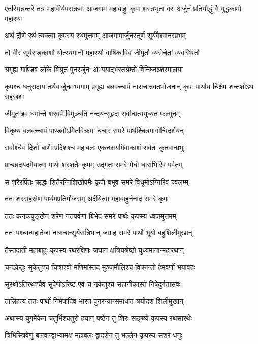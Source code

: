 \threelineshloka
{एतस्मिन्नन्तरे तत्र महावीर्यपराक्रमः}
{आजगाम महाबाहुः कृपः शस्त्रभृतां वरः}
{अर्जुनं प्रतियोद्धुं वै युद्धकामो महारथः}


\twolineshloka
{अथं द्रौणे रथं त्यक्त्वा कृपस्य रथमुत्तमम्}
{आजगामार्जुनस्तूर्णं सूर्यवैश्वानरप्रभम्}


\twolineshloka
{तौ वीर सूर्यसङ्काशौ योत्स्यमानौ महारथौ}
{वाषिकाविव जीमूतौ व्यरोचेतां व्यवस्थितौ}


\twolineshloka
{श्रगृह्य गाण्डिवं लोके विश्रुतं पुनरर्जुनः}
{अभ्ययाद्भरतश्रेष्ठो विनिघ्नञ्शरमालया}


\onelineshloka
{कृपश्च धनुरादाय तथैवार्जुनमभ्यगाम्}
\twolineshloka
{प्रगृह्य बलवच्चापं नाराचान्रक्तभोजनान्}
{कृपः पार्थाय चिक्षेप शन्तशोऽथ सहस्रशः}


\twolineshloka
{जीमूत इव धर्मान्ते शरवर्पं विमुञ्चति}
{नन्दयन्सुहृदः सर्वान्प्रत्ययुध्यत फल्गुनम्}


\twolineshloka
{विकृष्य बलवच्चापं पाण्डवोऽमितविक्रमः}
{चचार समरे पार्थश्चित्रमार्गान्विदर्शयन्}


\twolineshloka
{सर्वाश्चैव दिशो बाणैः प्रदिशश्च महाबलः}
{एकच्छायमिवाकाशं सर्वतः कृतवान्प्रभुः}


\twolineshloka
{प्राच्छादयदमेयात्मा पार्थः शरशतैः कृपम्}
{उद्गतः समरे मेघो धाराभिरिव पर्वतम्}


\twolineshloka
{स शरैरर्पितः ऋद्धः शितैरग्निशिखोपमैः}
{कृपो बभूव समरे विधूमोऽग्निरिव ज्वलम्म्}


\twolineshloka
{ततः शरसहस्रेण पार्थमप्रतिमौजसम्}
{अर्दयित्वा महाबाहुर्ननाद समरे कृपः}


\twolineshloka
{ततः कनकपुङ्खेन शरेण नतपर्वणा}
{बिभेद समरे पार्थः कृपस्य ध्वजमुत्तमम्}


\twolineshloka
{ततः पश्चान्महातेजा नाराचान्सूर्यसन्निभान्}
{जग्राह समरे पार्थो भूयो बहुशिलीमुखान्}


\twolineshloka
{तैस्तदातीं महाबाहुः कृपस्य रथरक्षिणः}
{जघान क्षत्रियश्रेष्ठो युध्यमानान्महारथान्}


\twolineshloka
{चन्द्रकेतुः सुकेतुश्च चित्राश्वो मणिमांस्तद}
{मुञ्जमौलिश्च विक्रान्तो हेमवर्णो भयावहः}


\twolineshloka
{सुरथोऽतिरथश्चैव सुपेणोऽरिष्ट एव च}
{नृकेतुश्च सहानीकास्ते निषेदुर्गतासवः}


\twolineshloka
{तान्निहत्य ततः पार्थो निमेपादिव भारत}
{पुनरन्यान्समाधत्त त्रयोदश शिलीमुखान्}


\twolineshloka
{अथास्य युगमेकेन चतुर्भिश्चतुरो हयान्}
{षष्ठेन तु शिरः सङ्ख्ये कृपस्य रथसारथेः}


\twolineshloka
{त्रिभिस्त्रिवेणुं बलवान्द्वाभ्यामक्षं महाबलः}
{द्वादशेन तु भल्लेन कृपस्य सशरं धनुः}


